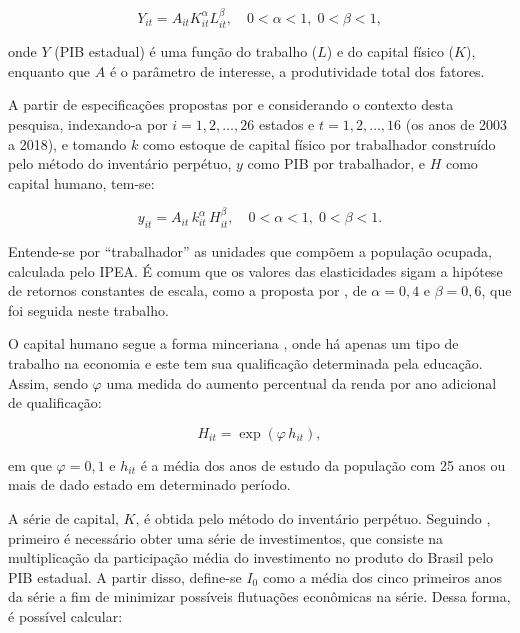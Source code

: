 \documentclass[
  12pt,
  a4paper,
  oneside,
  brazil,
  chapter=TITLE,
  section=TITLE
]{abntex2}
\begin{document}
\begin{equation}
  Y_{it} = A_{it} K_{it}^{\alpha} L_{it}^{\beta}, \quad 0 < \alpha < 1,\; 0 < \beta < 1,
  \label{eq:cobb_douglas}
\end{equation}

\noindent onde $Y$ (PIB estadual) é uma função do trabalho ($L$) e do capital físico ($K$), enquanto que $A$ é o parâmetro de interesse, a produtividade total dos fatores.

A partir de especificações propostas por  e considerando o contexto desta pesquisa, indexando-a por $i = 1, 2, \ldots, 26$ estados e $t = 1, 2, \ldots, 16$ (os anos de 2003 a 2018), e tomando $k$ como estoque de capital físico por trabalhador construído pelo método do inventário perpétuo, $y$ como PIB por trabalhador, e $H$ como capital humano, tem-se:

\begin{equation}
  y_{it} = A_{it}\, k_{it}^{\alpha}\, H_{it}^{\beta}, \quad 0 < \alpha < 1,\; 0 < \beta < 1.
  \label{eq:cd_perworker}
\end{equation}

Entende-se por ``trabalhador'' as unidades que compõem a população ocupada, calculada pelo IPEA. É comum que os valores das elasticidades sigam a hipótese de retornos constantes de escala, como a proposta por , de $\alpha = 0{,}4$ e $\beta = 0{,}6$, que foi seguida neste trabalho.

O capital humano segue a forma minceriana \cite{ferreira2003,maia2013}, onde há apenas um tipo de trabalho na economia e este tem sua qualificação determinada pela educação. Assim, sendo $\varphi$ uma medida do aumento percentual da renda por ano adicional de qualificação:

\begin{equation}
  H_{it} = \exp\!\left(\varphi\, h_{it}\right),
  \label{eq:human_capital}
\end{equation}

\noindent em que $\varphi = 0{,}1$ \cite{ferreira2010} e $h_{it}$ é a média dos anos de estudo da população com 25 anos ou mais de dado estado em determinado período.

A série de capital, $K$, é obtida pelo método do inventário perpétuo. Seguindo , primeiro é necessário obter uma série de investimentos, que consiste na multiplicação da participação média do investimento no produto do Brasil pelo PIB estadual. A partir disso, define-se $I_0$ como a média dos cinco primeiros anos da série a fim de minimizar possíveis flutuações econômicas na série. Dessa forma, é possível calcular:
\end{document}
